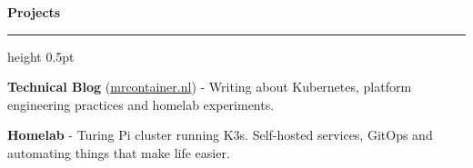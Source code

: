 \vspace{0.1cm}

{\large\bfseries\color{primary}Projects}
\vspace{0.1cm}
\hrule height 0.5pt
\vspace{0.15cm}

\textbf{Technical Blog} (\href{https://mrcontainer.nl}{mrcontainer.nl}) - Writing about Kubernetes, platform engineering practices and homelab experiments.

\textbf{Homelab} - Turing Pi cluster running K3s. Self-hosted services, GitOps and automating things that make life easier.
